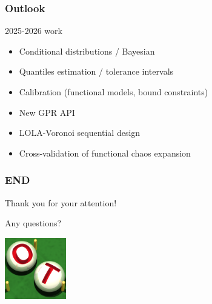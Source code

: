 \documentclass[aspectratio=169]{beamer}
\begin{document}

\begin{frame}
\frametitle{Outlook}
\begin{block}{2025-2026 work}
\begin{itemize}
\item Conditional distributions / Bayesian
\item Quantiles estimation / tolerance intervals
\item Calibration (functional models, bound constraints)
\item New GPR API
\item LOLA-Voronoi sequential design
\item Cross-validation of functional chaos expansion
\end{itemize}
\end{block}
\end{frame}


\begin{frame}
\frametitle{END}

Thank you for your attention!

Any questions?

\begin{center}
\includegraphics[width=0.2\textwidth]{figures/logo-ot-small}
\end{center}

\end{frame}

% 
% 
% 
% 
\end{document}
